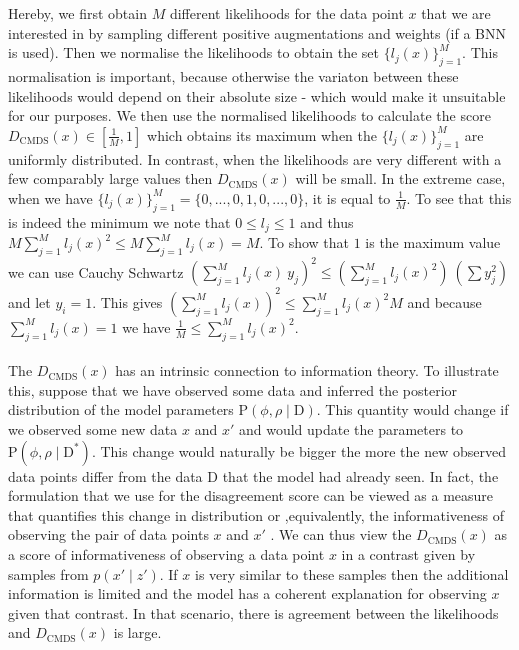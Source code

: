 \documentclass[tablecaption=bottom,wcp]{jmlr} %
\begin{document}
Hereby, we first obtain $M$ different likelihoods for the data point $x$ that we are interested in by sampling different positive augmentations and weights (if a BNN is used). Then we normalise the likelihoods to obtain the set $\{l_{j}(x)\}_{j=1}^{M}$. This normalisation is important, because otherwise the variaton between these likelihoods would depend on their absolute size - which would make it unsuitable for our purposes. We then use the normalised likelihoods to calculate the score $D_{\text{CMDS}}(x) \in [\frac{1}{M},1]$ which obtains its maximum when the $\{l_{j}(x)\}_{j=1}^{M}$ are uniformly distributed. In contrast, when the likelihoods are very different with a few comparably large values then $D_{\text{CMDS}}(x)$ will be small. In the extreme case, when we have $\{l_{j}(x)\}_{j=1}^{M} = \{0,...,0,1,0,...,0\}$, it is equal to $\frac{1}{M}$. To see that this is indeed the minimum we note that $0 \leq l_{j} \leq 1$ and thus $M \sum_{j=1}^{M} l_{j}(x)^2 \leq M \sum_{j=1}^{M} l_{j}(x) = M$. To show that $1$ is the maximum value we can use Cauchy Schwartz $(\sum_{j=1}^{M} l_{j}(x) \ y_j)^2 \leq(\sum_{j=1}^{M} l_{j}(x)^2) \ (\sum y_{j}^{2} )$ and let $y_i =1$. This gives 
$(\sum_{j=1}^{M} l_{j}(x))^2 \leq \sum_{j=1}^{M} l_{j}(x)^2 M$ and because $\sum_{j=1}^{M} l_{j}(x) = 1$ we have $\frac{1}{M} \leq \sum_{j=1}^{M} l_{j}(x)^2$. 
\\\\
The $D_{\text{CMDS}}(x)$ has an intrinsic connection to information theory. To illustrate this, suppose that we have observed some data and inferred the posterior distribution of the model parameters $\mathrm{P}(\phi, \rho \mid \mathrm{D} )$. This quantity would change if we observed some new data $x$ and $x'$ and would update the parameters to $\mathrm{P}(\phi, \rho \mid \mathrm{D}^{*})$. This change would naturally be bigger the more the new observed data points differ from the data $\mathrm{D}$ that the model had already seen. In fact, the formulation that we use for the disagreement score can be viewed as a measure that quantifies this change in distribution or ,equivalently, the informativeness of observing the pair of data points $x$ and $x'$ \citep{BVAE}. We can thus view the $D_{\text{CMDS}}(x)$ as a score of informativeness of observing a data point $x$ in a contrast given by samples from $p(x'\mid z')$. If $x$ is very similar to these samples then the additional information is limited and the model has a coherent explanation for observing $x$ given that contrast. In that scenario, there is agreement between the likelihoods and  $D_{\text{CMDS}}(x)$ is large.  \\\\
\end{document}
